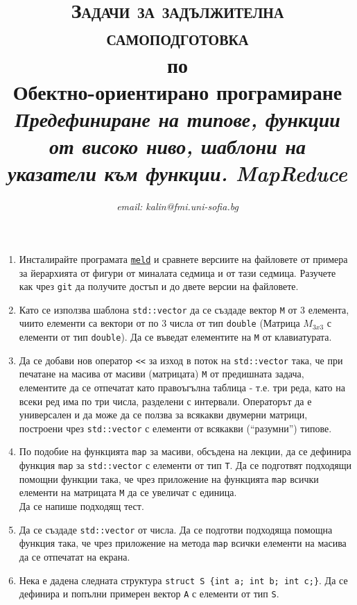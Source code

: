 \documentclass[12pt,a4paper]{article}
\author{\textit{email: kalin@fmi.uni-sofia.bg}}
\title{\textsc{Задачи за задължителна самоподготовка} \\
по \\
Обектно-ориентирано програмиране\\
\textit{Предефиниране на типове, функции от високо ниво, шаблони на указатели към функции. MapReduce}}
\begin{document}
\maketitle


\begin{enumerate}

\item Инсталирайте програмата \href{http://meldmerge.org/}{\texttt{meld}} и сравнете версиите на файловете от примера за йерархията от фигури от миналата седмица и от тази седмица. Разучете как чрез \texttt{git} да получите достъп и до двете версии на файловете.

\item Като се използва шаблона \texttt{std::vector} да се създаде вектор \texttt{M} от 3 елемента, чиито елементи са вектори от по 3 числа от тип \texttt{double} (Матрица $M_{3x3}$ с елементи от тип \texttt{double}). Да се въведат елементите на \texttt{M} от клавиатурата.

\item Да се добави нов оператор \texttt{<{}<} за изход в поток на \texttt{std::vector} така, че при печатане на масива от масиви (матрицата) \texttt{M} от предишната задача, елементите да се отпечатат като правоъгълна таблица - т.е. три реда, като на всеки ред има по три числа, разделени с интервали. Операторът да е универсален и да може да се ползва за всякакви двумерни матрици, построени чрез \texttt{std::vector} с елементи от всякакви (``разумни'') типове.

\item По подобие на функцията \texttt{map} за масиви, обсъдена на лекции, да се дефинира функция \texttt{map} за \texttt{std::vector} с елементи от тип \texttt{T}. Да се подготвят подходящи помощни функции така, че чрез приложение на функцията \texttt{map} всички елементи на матрицата \texttt{M} да се увеличат с единица. \\

Да се напише подходящ тест.

\item Да се създаде \texttt{std::vector} от числа. Да се подготви подходяща помощна функция така, че чрез приложение на метода \texttt{map} всички елементи на масива да се отпечатат на екрана.

\item Нека е дадена следната структура \texttt{struct S \{int a; int b; int c;\}}. Да се дефинира и попълни примерен вектор \texttt{A} с елементи от тип \texttt{S}.


\end{enumerate}
\end{document}
